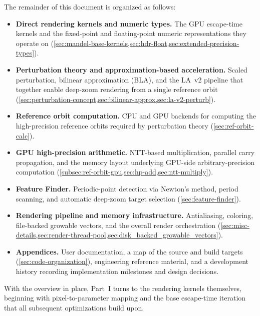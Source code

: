 The remainder of this document is organized as follows:
\begin{itemize}
  \item \textbf{Direct rendering kernels and numeric types.}
        The GPU escape-time kernels and the fixed-point and floating-point
        numeric representations they operate on
        (\cref{sec:mandel-base-kernels,sec:hdr-float,sec:extended-precision-types}).
  \item \textbf{Perturbation theory and approximation-based acceleration.}
        Scaled perturbation, bilinear approximation (BLA), and the LA~v2
        pipeline that together enable deep-zoom rendering from a single
        reference orbit
        (\cref{sec:perturbation-concept,sec:bilinear-approx,sec:la-v2-perturb}).
  \item \textbf{Reference orbit computation.}
        CPU and GPU backends for computing the high-precision reference orbits
        required by perturbation theory (\cref{sec:ref-orbit-calc}).
  \item \textbf{GPU high-precision arithmetic.}
        NTT-based multiplication, parallel carry propagation, and the
        memory layout underlying GPU-side arbitrary-precision computation
        (\cref{subsec:ref-orbit-gpu,sec:hp-add,sec:ntt-multiply}).
  \item \textbf{Feature Finder.}
        Periodic-point detection via Newton's method, period scanning, and
        automatic deep-zoom target selection (\cref{sec:feature-finder}).
  \item \textbf{Rendering pipeline and memory infrastructure.}
        Antialiasing, coloring, file-backed growable vectors, and the overall
        render orchestration (\cref{sec:misc-details,sec:render-thread-pool,sec:disk_backed_growable_vectors}).
  \item \textbf{Appendices.}
        User documentation, a map of the source and build targets
        (\cref{sec:code-organization}), engineering reference material, and a
        development history recording implementation milestones and design
        decisions.
\end{itemize}

With the overview in place, Part~I turns to the rendering kernels themselves,
beginning with pixel-to-parameter mapping and the base escape-time iteration
that all subsequent optimizations build upon.
